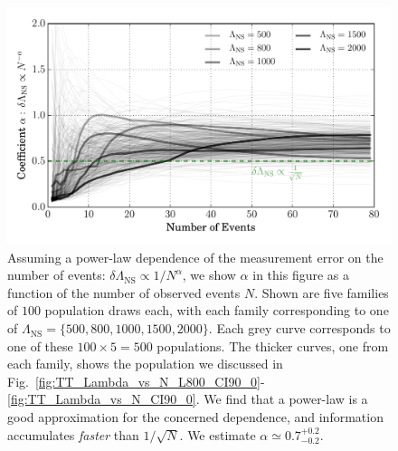 \documentclass[aps,prd,amsmath,floats,floatfix, twocolumn,
superscriptaddress,nofootinbib,showpacs]{revtex4-1}
\newcommand{\lambdans}{\Lambda_\mathrm{NS}}
\begin{document}
% 
% 
\begin{figure}
\centering    
\includegraphics[width=1.05\columnwidth]{plots/PowerLawCoefficient_LambdaErrorvsN_vs_N.pdf}
\caption{%
Assuming a power-law dependence of the measurement error on the number of
events: $\delta\lambdans\propto 1/N^\alpha$, we show $\alpha$ in this figure
as a function of the number of observed events $N$. Shown are five families
of $100$ population draws each, with each family corresponding to one of
$\lambdans=\{500,800,1000,1500,2000\}$. Each grey curve corresponds to one
of these $100\times5 = 500$ populations. The thicker curves, one from each
family, shows the population we discussed in
Fig.~\ref{fig:TT_Lambda_vs_N_L800_CI90_0}-\ref{fig:TT_Lambda_vs_N_CI90_0}.
We find that a power-law is a good approximation for the concerned dependence,
and information accumulates {\it faster} than $1/\sqrt{N}$. We estimate
$\alpha\simeq 0.7^{+0.2}_{-0.2}$.
}
\label{fig:TT_PowerLawLambdaErrorVsN}
\end{figure}
\end{document}
